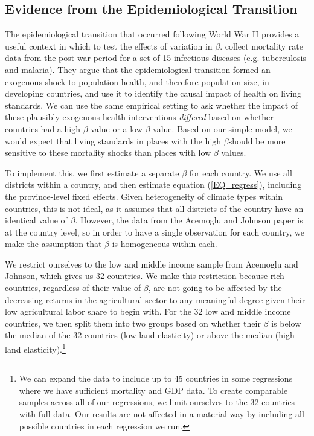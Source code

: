 \documentclass[11pt]{article}
\begin{document}
\subsection{Evidence from the Epidemiological Transition}\label{SEC_ajtest}
The epidemiological transition that occurred following World War II provides a useful context in which to test the effects of variation in $\beta$. \cite{aj07} collect mortality rate data from the post-war period for a set of 15 infectious diseases (e.g. tuberculosis and malaria). They argue that the epidemiological transition formed an exogenous shock to population health, and therefore population size, in developing countries, and use it to identify the causal impact of health on living standards. We can use the same empirical setting to ask whether the impact of these plausibly exogenous health interventions \textit{differed} based on whether countries had a high $\beta$ value or a low $\beta$ value. Based on our simple model, we would expect that living standards in places with the high $\beta$should be more sensitive to these mortality shocks than places with low $\beta$ values.

To implement this, we first estimate a separate $\beta$ for each country. We use all districts within a country, and then estimate equation (\ref{EQ_regress}), including the province-level fixed effects. Given heterogeneity of climate types within countries, this is not ideal, as it assumes that all districts of the country have an identical value of $\beta$. However, the data from the Acemoglu and Johnson paper is at the country level, so in order to have a single observation for each country, we make the assumption that $\beta$ is homogeneous within each.

We restrict ourselves to the low and middle income sample from Acemoglu and Johnson, which gives us 32 countries. We make this restriction because rich countries, regardless of their value of $\beta$, are not going to be affected by the decreasing returns in the agricultural sector to any meaningful degree given their low agricultural labor share to begin with. For the 32 low and middle income countries, we then split them into two groups based on whether their $\beta$ is below the median of the 32 countries (low land elasticity) or above the median (high land elasticity).\footnote{We can expand the data to include up to 45 countries in some regressions where we have sufficient mortality and GDP data. To create comparable samples across all of our regressions, we limit ourselves to the 32 countries with full data. Our results are not affected in a material way by including all possible countries in each regression we run.}
\end{document}
